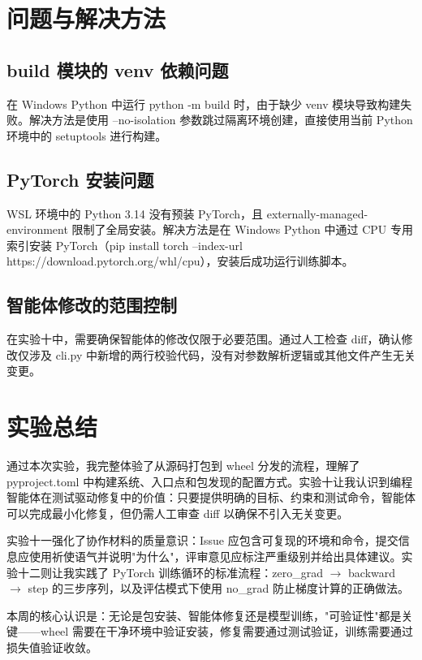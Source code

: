 \documentclass[UTF8]{ctexart}
\begin{document}
\section{问题与解决方法}

\subsection{build 模块的 venv 依赖问题}

在 Windows Python 中运行 python -m build 时，由于缺少 venv 模块导致构建失败。解决方法是使用 --no-isolation 参数跳过隔离环境创建，直接使用当前 Python 环境中的 setuptools 进行构建。

\subsection{PyTorch 安装问题}

WSL 环境中的 Python 3.14 没有预装 PyTorch，且 externally-managed-environment 限制了全局安装。解决方法是在 Windows Python 中通过 CPU 专用索引安装 PyTorch（pip install torch --index-url https://download.pytorch.org/whl/cpu），安装后成功运行训练脚本。

\subsection{智能体修改的范围控制}

在实验十中，需要确保智能体的修改仅限于必要范围。通过人工检查 diff，确认修改仅涉及 cli.py 中新增的两行校验代码，没有对参数解析逻辑或其他文件产生无关变更。

\section{实验总结}

通过本次实验，我完整体验了从源码打包到 wheel 分发的流程，理解了 pyproject.toml 中构建系统、入口点和包发现的配置方式。实验十让我认识到编程智能体在测试驱动修复中的价值：只要提供明确的目标、约束和测试命令，智能体可以完成最小化修复，但仍需人工审查 diff 以确保不引入无关变更。

实验十一强化了协作材料的质量意识：Issue 应包含可复现的环境和命令，提交信息应使用祈使语气并说明"为什么"，评审意见应标注严重级别并给出具体建议。实验十二则让我实践了 PyTorch 训练循环的标准流程：zero\_grad $\to$ backward $\to$ step 的三步序列，以及评估模式下使用 no\_grad 防止梯度计算的正确做法。

本周的核心认识是：无论是包安装、智能体修复还是模型训练，"可验证性"都是关键——wheel 需要在干净环境中验证安装，修复需要通过测试验证，训练需要通过损失值验证收敛。
\end{document}
